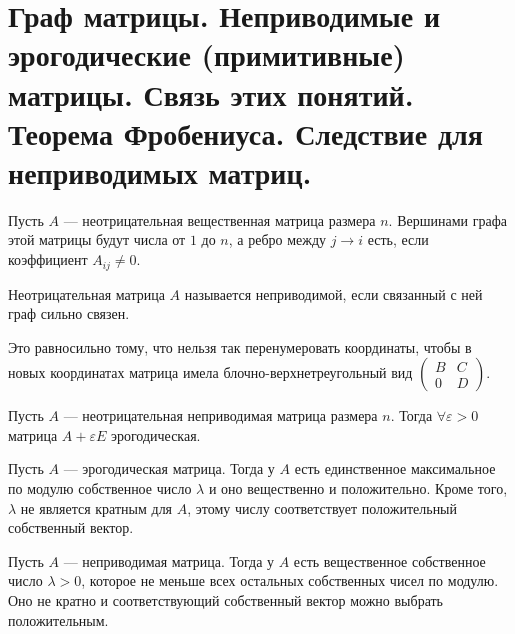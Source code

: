 \section{Граф матрицы. Неприводимые и эрогодические (примитивные) матрицы. Связь этих понятий. Теорема Фробениуса. Следствие для неприводимых матриц.}
\begin{defn}
    Пусть $ A$ ---  неотрицательная вещественная матрица размера   $ n$. Вершинами графа этой матрицы будут числа от  $ 1$ до  $ n$, а ребро между  $ j \to  i$ есть, если коэффициент $ A_{ij} \ne 0$.
\end{defn}
\begin{defn}
    Неотрицательная матрица $ A$ называется  {\sf неприводимой}, если связанный с ней граф сильно связен.  
    \begin{note}
        Это равносильно тому, что нельзя так перенумеровать координаты, чтобы в новых координатах матрица имела блочно-верхнетреугольный  вид
	$
	\begin{pmatrix}
	    B & C \\ 0 &D
	\end{pmatrix}
	$.
    \end{note}
\end{defn}
\begin{lm}
    Пусть $ A$ --- неотрицательная неприводимая матрица размера  $ n$. Тогда  $ \forall \varepsilon >0 $ матрица $ A + \varepsilon E$ эрогодическая.
\end{lm}
\begin{thm}[Фробениус, 1912]
    Пусть $ A$ --- эрогодическая матрица. Тогда у $ A$ есть единственное максимальное по модулю собственное число  $ \lambda $ и оно вещественно и положительно. Кроме того, $ \lambda $ не является кратным для $ A$, этому числу соответствует положительный собственный вектор.
\end{thm}
\begin{cor}
    Пусть $ A$ --- неприводимая матрица. Тогда у  $ A$ есть вещественное собственное число  $ \lambda  >0$, которое не меньше всех остальных собственных чисел по модулю. Оно не кратно и соответствующий собственный вектор можно выбрать положительным.
\end{cor}

